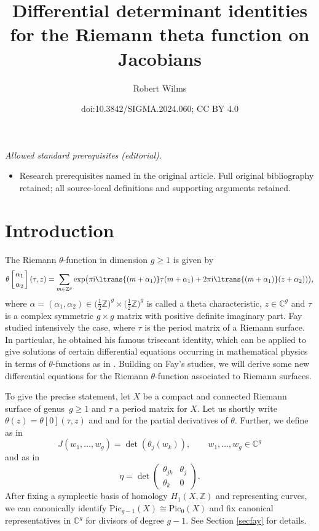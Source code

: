 \documentclass[10pt,a4paper]{amsart}
\title{Differential determinant identities for the Riemann theta function on Jacobians}
\author{Robert Wilms}
\date{doi:10.3842/SIGMA.2024.060; CC BY 4.0}
\numberwithin{equation}{section}
\newcommand\gf[2]{\genfrac{}{}{0pt}{}{#1}{#2}}
\begin{document}
\maketitle
\noindent\textit{Allowed standard prerequisites (editorial).}\begin{itemize}
\item Research prerequisites named in the original article. Full original bibliography retained; all source-local definitions and supporting arguments retained.
\end{itemize}\medskip
\section{Introduction}
The Riemann $\theta$-function in dimension $g\ge 1$ is given by
\[
\theta\left[\gf{\alpha_1}{\alpha_2}\right](\tau,z)=\sum_{m\in \mathbb{Z}^g}\exp\bigl(\pi {\rm i}\ltrans{(m+\alpha_1)}\tau(m+\alpha_1)+2\pi {\rm i}\ltrans{(m+\alpha_1)}(z+\alpha_2))\bigr),
\]
where $\alpha=(\alpha_1,\alpha_2)\in \bigl(\frac{1}{2}\mathbb{Z}\bigr)^g\times\bigl(\frac{1}{2}\mathbb{Z}\bigr)^g$ is called a theta characteristic, $z\in\mathbb{C}^g$ and $\tau$ is a complex symmetric $g\times g$ matrix with positive definite imaginary part. Fay \cite{Fay73} studied intensively the case, where $\tau$ is the period matrix of a Riemann surface. In particular, he obtained his famous trisecant identity, which can be applied to give solutions of certain differential equations occurring in mathematical physics in terms of $\theta$-functions as in \cite[Chapter~IIIb, Section~4]{Mum84}. Building on Fay's studies, we will derive some new differential equations for the Riemann $\theta$-function associated to Riemann surfaces.

To give the precise statement, let $X$ be a compact and connected Riemann surface of genus~${g\ge 1}$ and $\tau$ a period matrix for $X$. Let us shortly write $\theta(z)=\theta[0](\tau,z)$ and  and  for the partial derivatives of $\theta$. Further, we define as in \cite{Gua99}
\[J(w_1,\dots,w_g)=\det(\theta_j(w_k)),\qquad w_1,\dots,w_g\in \mathbb{C}^g\]
and as in \cite{dJo08}
\[\eta=\det\begin{pmatrix}
	\theta_{jk} & \theta_j\\ \theta_k&0 \end{pmatrix}.\]
After fixing a symplectic basis of homology $H_1(X,\mathbb{Z})$ and representing curves, we can canonically identify $\mathrm{Pic}_{g-1}(X)\cong \mathrm{Pic}_{0}(X)$ and fix canonical representatives in $\mathbb{C}^g$ for divisors of degree $g-1$. See Section \ref{secfay} for details.
\end{document}
